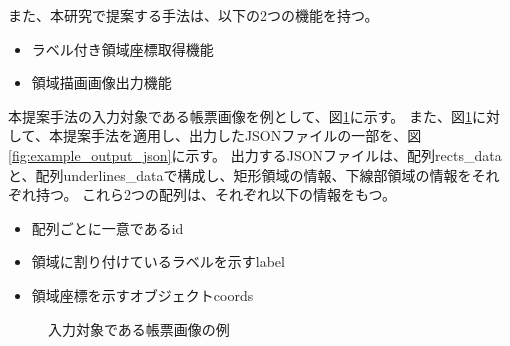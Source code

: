 また、本研究で提案する手法は、以下の2つの機能を持つ。

\begin{itemize}
    \item ラベル付き領域座標取得機能
    \item 領域描画画像出力機能
\end{itemize}

本提案手法の入力対象である帳票画像を例として、図\ref{fig:original}に示す。
また、図\ref{fig:original}に対して、本提案手法を適用し、出力したJSONファイルの一部を、図\ref{fig:example_output_json}に示す。
出力するJSONファイルは、配列rects\_dataと、配列underlines\_dataで構成し、矩形領域の情報、下線部領域の情報をそれぞれ持つ。
これら2つの配列は、それぞれ以下の情報をもつ。

\begin{itemize}
    \item 配列ごとに一意であるid
    \item 領域に割り付けているラベルを示すlabel
    \item 領域座標を示すオブジェクトcoords
\end{itemize}

\begin{figure}[t]
    \begin{center}
        \caption{入力対象である帳票画像の例}
        \label{fig:original}
    \end{center}
\end{figure}


